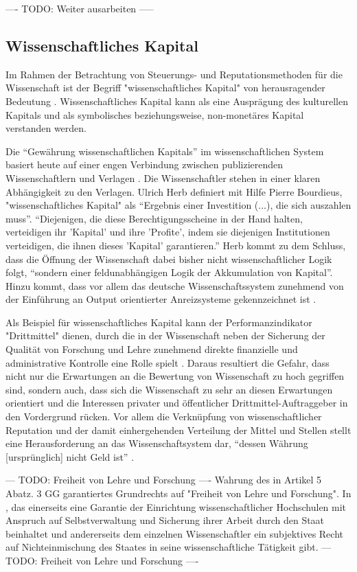 ---- TODO: Weiter ausarbeiten -----

\subsection{Wissenschaftliches Kapital}
Im Rahmen der Betrachtung von Steuerungs- und Reputationsmethoden für die Wissenschaft ist der Begriff "wissenschaftliches Kapital" von herausragender Bedeutung \cite{suchen}. Wissenschaftliches Kapital kann als eine Ausprägung des kulturellen Kapitals und als symbolisches beziehungsweise, non-monetäres Kapital \cite{irmer2011} verstanden werden. 

Die “Gewährung wissenschaftlichen Kapitals” im wissenschaftlichen System basiert heute auf einer engen Verbindung zwischen publizierenden Wissenschaftlern und Verlagen \cite{herb_2006}. Die Wissenschaftler stehen in einer klaren Abhängigkeit zu den Verlagen. Ulrich Herb definiert mit Hilfe Pierre Bourdieus, "wissenschaftliches Kapital" als “Ergebnis einer Investition (...), die sich auszahlen muss”. “Diejenigen, die diese Berechtigungsscheine in der Hand halten, verteidigen ihr 'Kapital' und ihre 'Profite', indem sie diejenigen Institutionen verteidigen, die ihnen dieses 'Kapital' garantieren.” \cite{Bourdieu_1992} Herb kommt zu dem Schluss, dass die Öffnung der Wissenschaft dabei bisher nicht wissenschaftlicher Logik folgt, “sondern einer feldunabhängigen Logik der Akkumulation von Kapital”\cite{herb_2006}. Hinzu kommt, dass vor allem das deutsche Wissenschaftssystem zunehmend von der Einführung an Output orientierter Anreizsysteme gekennzeichnet ist \cite{osterloh2008anreize}.

Als Beispiel für wissenschaftliches Kapital kann der Performanzindikator "Drittmittel" \cite{Jansen_2007} dienen, durch die in der Wissenschaft neben der Sicherung der Qualität von Forschung und Lehre zunehmend direkte finanzielle und administrative Kontrolle eine Rolle spielt \cite{Barl_sius_2008}. Daraus resultiert die Gefahr, dass nicht nur die Erwartungen an die Bewertung von Wissenschaft zu hoch gegriffen sind, sondern auch, dass sich die Wissenschaft zu sehr an diesen Erwartungen orientiert und die Interessen privater und öffentlicher Drittmittel-Auftraggeber in den Vordergrund rücken.  Vor allem die Verknüpfung von wissenschaftlicher Reputation und der damit einhergehenden Verteilung der Mittel und Stellen stellt eine Herausforderung an das Wissenschaftsystem dar, “dessen Währung [ursprünglich] nicht Geld ist” \cite{hanekop_2006}. 

--- TODO: Freiheit von Lehre und Forschung ----
Wahrung des in Artikel 5 Abatz. 3 GG garantiertes Grundrechts auf "Freiheit von Lehre und Forschung". In , das einerseits eine Garantie der Einrichtung wissenschaftlicher Hochschulen mit Anspruch auf Selbstverwaltung und Sicherung ihrer Arbeit durch den Staat beinhaltet und andererseits dem einzelnen Wissenschaftler ein subjektives Recht auf Nichteinmischung des Staates in seine wissenschaftliche Tätigkeit gibt. --- TODO: Freiheit von Lehre und Forschung ----

